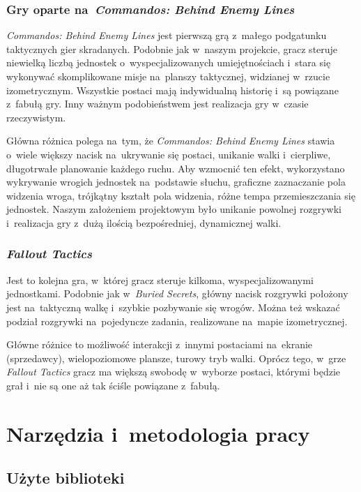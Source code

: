 \documentclass[licencjacka]{pracamgr}
\begin{document}
    \subsection{Gry oparte na~\emph{Commandos: Behind Enemy Lines}\cite{CBEL}}
      \emph{Commandos: Behind Enemy Lines} jest pierwszą grą z~małego podgatunku taktycznych gier skradanych. Podobnie jak
      w~naszym projekcie, gracz steruje niewielką liczbą jednostek o~wyspecjalizowanych umiejętnościach i~stara się
      wykonywać skomplikowane misje na~planszy taktycznej, widzianej w~rzucie izometrycznym. Wszystkie postaci mają
      indywidualną historię i~są powiązane z~fabułą gry. Inny ważnym podobieństwem jest realizacja gry w~czasie
      rzeczywistym.

      Główna różnica polega na~tym, że \emph{Commandos: Behind Enemy Lines} stawia o~wiele większy nacisk na~ukrywanie
      się postaci, unikanie walki i~cierpliwe, długotrwałe planowanie każdego ruchu. Aby wzmocnić ten efekt, wykorzystano
      wykrywanie wrogich jednostek na~podstawie słuchu, graficzne zaznaczanie pola widzenia wroga, trójkątny kształt pola
      widzenia, różne tempa przemieszczania się jednostek. Naszym założeniem projektowym było unikanie powolnej rozgrywki
      i~realizacja gry z~dużą ilością bezpośredniej, dynamicznej walki.

    \subsection{\emph{Fallout Tactics}\cite{FT}}
      Jest to kolejna gra, w~której gracz steruje kilkoma, wyspecjalizowanymi jednostkami. Podobnie jak
      w~\emph{Buried Secrets}, główny nacisk rozgrywki położony jest na~taktyczną walkę i~szybkie pozbywanie się wrogów.
      Można też wskazać podział rozgrywki na~pojedyncze zadania, realizowane na~mapie izometrycznej.

      Główne różnice to możliwość interakcji z~innymi postaciami na~ekranie (sprzedawcy), wielopoziomowe plansze,
      turowy tryb walki. Oprócz tego, w~grze \emph{Fallout Tactics} gracz ma większą swobodę w~wyborze postaci, którymi
      będzie grał i~nie są one aż tak ściśle powiązane z~fabułą.

\chapter{Narzędzia i~metodologia pracy}
  \section{Użyte biblioteki}
\end{document}
